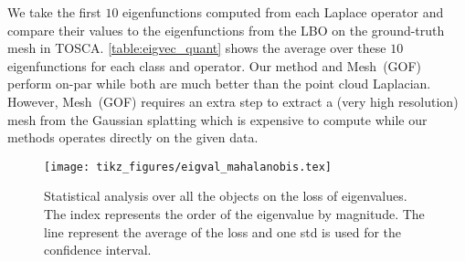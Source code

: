 We take the first $10$ eigenfunctions computed from each Laplace operator and compare their values to the eigenfunctions from the LBO on the ground-truth mesh in TOSCA. 
\cref{table:eigvec_quant} shows the average over these $10$ eigenfunctions for each class and operator.
Our method and Mesh~(GOF) perform on-par while both are much better than the point cloud Laplacian. 
However, Mesh~(GOF) requires an extra step to extract a (very high resolution) mesh from the Gaussian splatting which is expensive to compute while our methods operates directly on the given data.



\begin{figure}[ht]
    \centering
    \texttt{[image: tikz\_figures/eigval\_mahalanobis.tex]}
    \caption{Statistical analysis over all the objects on the loss of eigenvalues. The index represents the order of the eigenvalue by magnitude. The line represent the average of the loss and one std is used for the confidence interval.}
    \label{fig:eigval}
\end{figure}


